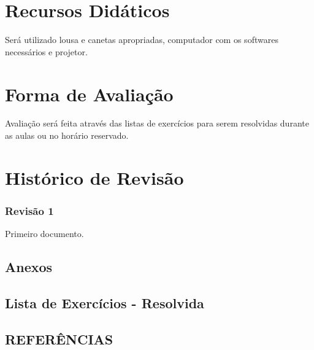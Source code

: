 \documentclass[12pt,a4paper]{report}
\begin{document}
\chapter{Recursos Didáticos}

Será utilizado lousa e canetas apropriadas, computador com os softwares necessários e projetor.

\chapter{Forma de Avaliação}

Avaliação será feita através das listas de exercícios para serem resolvidas durante as aulas ou no horário reservado.

\newpage

\chapter{Histórico de Revisão}

\subsection*{Revisão 1}

Primeiro documento.

\newpage

\begin{appendices}

    \chapter{Anexos}

    \section{Lista de Exercícios - Resolvida}
    

\end{appendices}

\newpage

\begin{center}
    \chapter*{REFERÊNCIAS}
\end{center}




\endgroup
\end{document}
